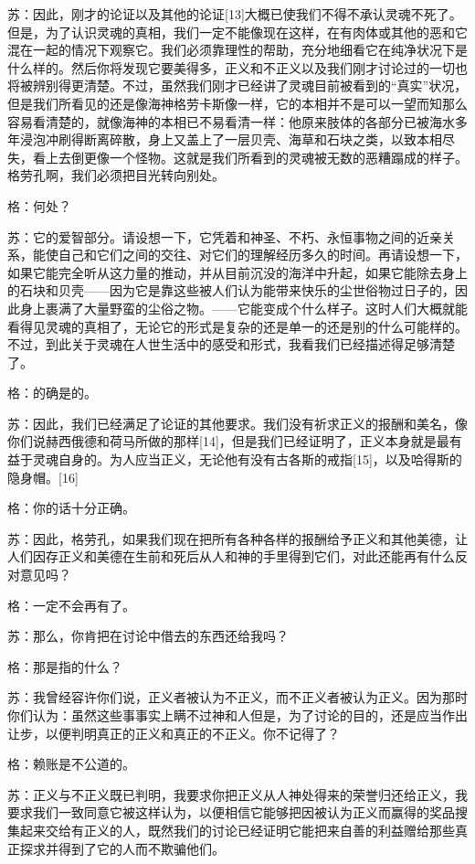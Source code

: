 \documentclass[12pt,oneside]{book}
\begin{document}
苏：因此，刚才的论证以及其他的论证[13]大概已使我们不得不承认灵魂不死了。但是，为了认识灵魂的真相，我们一定不能像现在这样，在有肉体或其他的恶和它混在一起的情况下观察它。我们必须靠理性的帮助，充分地细看它在纯净状况下是什么样的。然后你将发现它要美得多，正义和不正义以及我们刚才讨论过的一切也将被辨别得更清楚。不过，虽然我们刚才已经讲了灵魂目前被看到的“真实”状况，但是我们所看见的还是像海神格劳卡斯像一样，它的本相并不是可以一望而知那么容易看清楚的，就像海神的本相已不易看清一样：他原来肢体的各部分已被海水多年浸泡冲刷得断离碎散，身上又盖上了一层贝壳、海草和石块之类，以致本相尽失，看上去倒更像一个怪物。这就是我们所看到的灵魂被无数的恶糟蹋成的样子。格劳孔啊，我们必须把目光转向别处。

格：何处？

苏：它的爱智部分。请设想一下，它凭着和神圣、不朽、永恒事物之间的近亲关系，能使自己和它们之间的交往、对它们的理解经历多久的时间。再请设想一下，如果它能完全听从这力量的推动，并从目前沉没的海洋中升起，如果它能除去身上的石块和贝壳——因为它是靠这些被人们认为能带来快乐的尘世俗物过日子的，因此身上裹满了大量野蛮的尘俗之物。——它能变成个什么样子。这时人们大概就能看得见灵魂的真相了，无论它的形式是复杂的还是单一的还是别的什么可能样的。不过，到此关于灵魂在人世生活中的感受和形式，我看我们已经描述得足够清楚了。

格：的确是的。

苏：因此，我们已经满足了论证的其他要求。我们没有祈求正义的报酬和美名，像你们说赫西俄德和荷马所做的那样[14]，但是我们已经证明了，正义本身就是最有益于灵魂自身的。为人应当正义，无论他有没有古各斯的戒指[15]，以及哈得斯的隐身帽。[16]

格：你的话十分正确。

苏：因此，格劳孔，如果我们现在把所有各种各样的报酬给予正义和其他美德，让人们因存正义和美德在生前和死后从人和神的手里得到它们，对此还能再有什么反对意见吗？

格：一定不会再有了。

苏：那么，你肯把在讨论中借去的东西还给我吗？

格：那是指的什么？

苏：我曾经容许你们说，正义者被认为不正义，而不正义者被认为正义。因为那时你们认为：虽然这些事事实上瞒不过神和人但是，为了讨论的目的，还是应当作出让步，以便判明真正的正义和真正的不正义。你不记得了？

格：赖账是不公道的。

苏：正义与不正义既已判明，我要求你把正义从人神处得来的荣誉归还给正义，我要求我们一致同意它被这样认为，以便相信它能够把因被认为正义而赢得的奖品搜集起来交给有正义的人，既然我们的讨论已经证明它能把来自善的利益赠给那些真正探求并得到了它的人而不欺骗他们。
\end{document}
